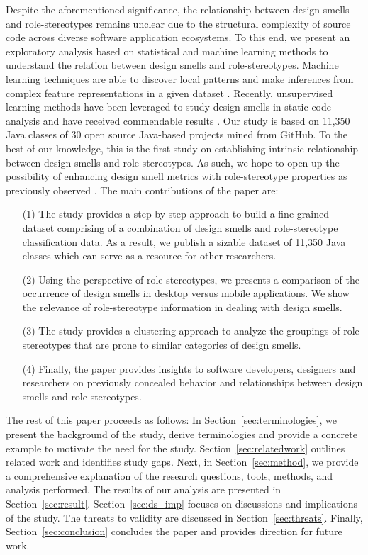 \documentclass[AMA,Times1COL]{WileyNJDv5} %
\begin{document}
Despite the aforementioned significance, the relationship between design smells and role-stereotypes remains unclear due to  the structural complexity of source code across diverse software application ecosystems. To this end, we present an exploratory analysis based on statistical and machine learning methods to understand the relation between design smells and role-stereotypes. Machine learning techniques are able to discover local patterns and make inferences from complex feature representations in a given dataset \cite{awad2015machine}. Recently, unsupervised learning methods have been leveraged to study design smells in static code analysis and have received commendable results \cite{caram2019machine,imran2019design,palomba2017investigating,tahmid2016understanding}. Our study is based on 11,350 Java classes of 30 open source Java-based projects mined from GitHub. To the best of our knowledge, this is the first study on establishing intrinsic relationship between design smells and role stereotypes.
As such, we hope to open up the possibility of enhancing design smell metrics with role-stereotype properties as previously observed \cite{nurwidyantoro2019automated}. The main contributions of the paper are:
\begin{itemize}
	\item [(1)] The study provides a step-by-step approach to build a fine-grained dataset comprising of a combination of design smells and role-stereotype classification data. As a result, we publish a sizable dataset of 11,350 Java classes which can serve as a resource for other researchers.
	\item [(2)] Using the perspective of role-stereotypes, we presents a comparison of the occurrence of design smells in desktop versus mobile applications. We show the relevance of role-stereotype information in dealing with design smells.
	\item [(3)]The study provides a clustering approach to analyze the groupings of role-stereotypes that are prone to similar categories of design smells.
	\item [(4)] Finally, the paper provides insights to software developers, designers and researchers on previously concealed behavior and relationships between design smells and role-stereotypes.
\end{itemize}

The rest of this paper proceeds as follows: In Section~\ref{sec:terminologies}, we present the background of the study, derive terminologies and provide a concrete example to motivate the need for the study. Section~\ref{sec:relatedwork} outlines related work and identifies study gaps. Next, in Section~\ref{sec:method}, we provide a comprehensive explanation of the research questions, tools, methods, and analysis performed. The results of our analysis are presented in Section~\ref{sec:result}. Section~\ref{sec:ds_imp} focuses on discussions and implications of the study. The threats to validity are discussed in Section~\ref{sec:threats}. Finally, Section~\ref{sec:conclusion} concludes the paper and provides direction for future work.
\end{document}
